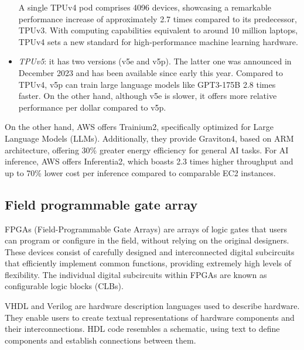 \begin{itemize}
        A single TPUv4 pod comprises 4096 devices, showcasing a remarkable performance increase of approximately 2.7 times compared to its predecessor, TPUv3. 
        With computing capabilities equivalent to around 10 million laptops, TPUv4 sets a new standard for high-performance machine learning hardware.
    \item \textit{TPUv5}: it has two versions (v5e and v5p). 
        The latter one was announced in December 2023 and has been available since early this year.
        Compared to TPUv4, v5p can train large language models like GPT3-175B 2.8 times faster.
        On the other hand, although v5e is slower, it offers more relative performance per dollar compared to v5p.
\end{itemize}
On the other hand, AWS offers Trainium2, specifically optimized for Large Language Models (LLMs). 
Additionally, they provide Graviton4, based on ARM architecture, offering 30\% greater energy efficiency for general AI tasks. 
For AI inference, AWS offers Inferentia2, which boasts 2.3 times higher throughput and up to 70\% lower cost per inference compared to comparable EC2 instances.

\subsection{Field programmable gate array}
FPGAs (Field-Programmable Gate Arrays) are arrays of logic gates that users can program or configure in the field, without relying on the original designers.
These devices consist of carefully designed and interconnected digital subcircuits that efficiently implement common functions, providing extremely high levels of flexibility. 
The individual digital subcircuits within FPGAs are known as configurable logic blocks (CLBs).

VHDL and Verilog are hardware description languages used to describe hardware. 
They enable users to create textual representations of hardware components and their interconnections. 
HDL code resembles a schematic, using text to define components and establish connections between them.

